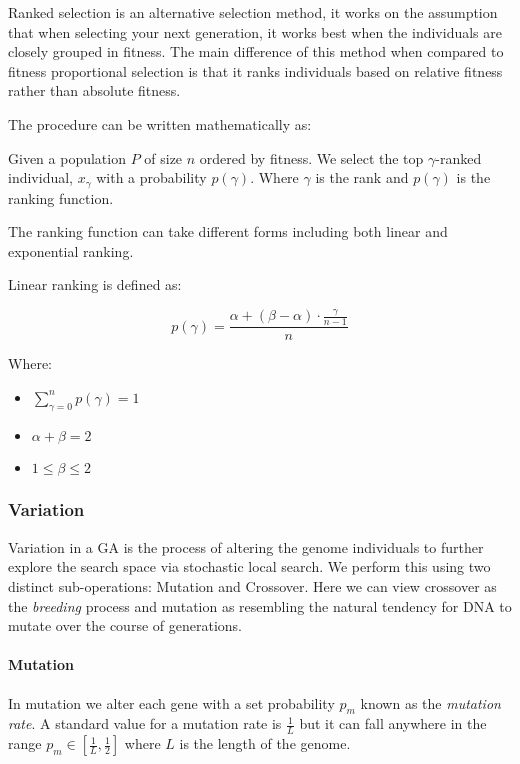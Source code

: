Ranked selection is an alternative selection method, it works on the assumption that when selecting your next generation, it works best when the individuals are closely grouped in fitness. The main difference of this method when compared to fitness proportional selection is that it ranks individuals based on relative fitness rather than absolute fitness.

The procedure can be written mathematically as:

Given a population $P$ of size $n$ ordered by fitness. We select the top \(\gamma\)-ranked individual, $x_{\gamma}$ with a probability $p(\gamma)$. Where \(\gamma\) is the rank and $p(\gamma)$ is the ranking function.

The ranking function can take different forms including both linear and exponential ranking.

Linear ranking is defined as:

\begin{equation}
p(\gamma)= \frac{\alpha + (\beta-\alpha) \cdot \frac{\gamma}{n-1}}{n}
\end{equation}

Where:

\begin{itemize}
  \item $\sum_{\gamma=0}^n p(\gamma) = 1$
  \item $\alpha + \beta = 2$
  \item $1 \leq \beta \leq 2$
\end{itemize}

\subsubsection{Variation}

Variation in a GA is the process of altering the genome individuals to further explore the search space via stochastic local search.
We perform this using two distinct sub-operations: Mutation and Crossover.
Here we can view crossover as the \textit{breeding} process and mutation as resembling the natural tendency for DNA to mutate over the course of generations.

\paragraph{Mutation}
In mutation we alter each gene with a set probability $p_m$ known as the \textit{mutation rate}. A standard value for a mutation rate is $ \frac{1}{L} $ but it can fall anywhere in the range $p_m \in [ \frac{1}{L} , \frac{1}{2} ] $ where $L$ is the length of the genome.

